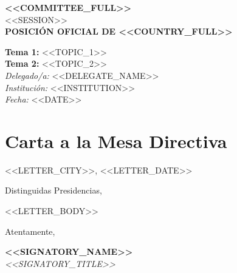\documentclass[12pt, a4paper]{article}
\begin{document}
\begin{titlepage}
\centering
\vspace*{2cm}

{\Large\textbf{<<COMMITTEE_FULL>>}}\\[0.5cm]
{\large <<SESSION>>}\\[2cm]

{\Huge\textbf{POSICIÓN OFICIAL DE <<COUNTRY_FULL>>}}\\[1.5cm]

\vspace{1cm}

\textbf{Tema 1:} <<TOPIC_1>>\\[0.3cm]
\textbf{Tema 2:} <<TOPIC_2>>\\[2cm]

\textit{Delegado/a:} <<DELEGATE_NAME>>\\[0.3cm]
\textit{Institución:} <<INSTITUTION>>\\[0.3cm]
\textit{Fecha:} <<DATE>>

\vfill
\end{titlepage}

\newpage
\fancyhead[L]{\small\textcolor{ungray}{<<COMMITTEE>>}}
\fancyhead[R]{\small\textcolor{ungray}{<<COUNTRY>>}}
\tableofcontents
\newpage

\section{Carta a la Mesa Directiva}

<<LETTER_CITY>>, <<LETTER_DATE>>

Distinguidas Presidencias,

<<LETTER_BODY>>

Atentamente,

\textbf{<<SIGNATORY_NAME>>}\\
\textit{<<SIGNATORY_TITLE>>}

\newpage

\end{document}
